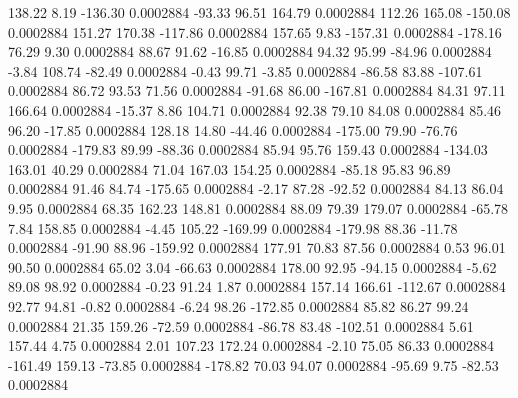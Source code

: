       138.22        8.19     -136.30     0.0002884
      -93.33       96.51      164.79     0.0002884
      112.26      165.08     -150.08     0.0002884
      151.27      170.38     -117.86     0.0002884
      157.65        9.83     -157.31     0.0002884
     -178.16       76.29        9.30     0.0002884
       88.67       91.62      -16.85     0.0002884
       94.32       95.99      -84.96     0.0002884
       -3.84      108.74      -82.49     0.0002884
       -0.43       99.71       -3.85     0.0002884
      -86.58       83.88     -107.61     0.0002884
       86.72       93.53       71.56     0.0002884
      -91.68       86.00     -167.81     0.0002884
       84.31       97.11      166.64     0.0002884
      -15.37        8.86      104.71     0.0002884
       92.38       79.10       84.08     0.0002884
       85.46       96.20      -17.85     0.0002884
      128.18       14.80      -44.46     0.0002884
     -175.00       79.90      -76.76     0.0002884
     -179.83       89.99      -88.36     0.0002884
       85.94       95.76      159.43     0.0002884
     -134.03      163.01       40.29     0.0002884
       71.04      167.03      154.25     0.0002884
      -85.18       95.83       96.89     0.0002884
       91.46       84.74     -175.65     0.0002884
       -2.17       87.28      -92.52     0.0002884
       84.13       86.04        9.95     0.0002884
       68.35      162.23      148.81     0.0002884
       88.09       79.39      179.07     0.0002884
      -65.78        7.84      158.85     0.0002884
       -4.45      105.22     -169.99     0.0002884
     -179.98       88.36      -11.78     0.0002884
      -91.90       88.96     -159.92     0.0002884
      177.91       70.83       87.56     0.0002884
        0.53       96.01       90.50     0.0002884
       65.02        3.04      -66.63     0.0002884
      178.00       92.95      -94.15     0.0002884
       -5.62       89.08       98.92     0.0002884
       -0.23       91.24        1.87     0.0002884
      157.14      166.61     -112.67     0.0002884
       92.77       94.81       -0.82     0.0002884
       -6.24       98.26     -172.85     0.0002884
       85.82       86.27       99.24     0.0002884
       21.35      159.26      -72.59     0.0002884
      -86.78       83.48     -102.51     0.0002884
        5.61      157.44        4.75     0.0002884
        2.01      107.23      172.24     0.0002884
       -2.10       75.05       86.33     0.0002884
     -161.49      159.13      -73.85     0.0002884
     -178.82       70.03       94.07     0.0002884
      -95.69        9.75      -82.53     0.0002884
